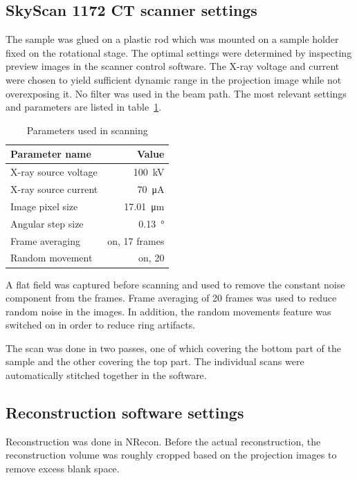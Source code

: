 \documentclass[a4paper,twoside,12pt]{article}
\begin{document}
\subsection{SkyScan 1172 CT scanner settings}
The sample was glued on a plastic rod which was mounted on a sample holder fixed on the rotational stage. The optimal settings were determined by inspecting preview images in the scanner control software. The X-ray voltage and current were chosen to yield sufficient dynamic range in the projection image while not overexposing it. No filter was used in the beam path. The most relevant settings and parameters are listed in table~\ref{table:settings}.

\begin{table}
    \centering
    \caption{Parameters used in scanning}
    \label{table:settings}
    \begin{tabular}{lr}
        \toprule
        Parameter name & Value \\
        \midrule
        X-ray source voltage & \SI{100}{\kilo\volt} \\
        X-ray source current & \SI{70}{\micro\ampere} \\
        Image pixel size & \SI{17.01}{\micro\meter} \\
        Angular step size & \SI{0.13}{\degree} \\
        Frame averaging & on, 17 frames \\
        Random movement & on, 20 \\
        \bottomrule
    \end{tabular}
\end{table}

A flat field was captured before scanning and used to remove the constant noise component from the frames. Frame averaging of 20 frames was used to reduce random noise in the images. In addition, the random movements feature was switched on in order to reduce ring artifacts.

The scan was done in two passes, one of which covering the bottom part of the sample and the other covering the top part. The individual scans were automatically stitched together in the software.

\subsection{Reconstruction software settings}
Reconstruction was done in NRecon. Before the actual reconstruction, the reconstruction volume was roughly cropped based on the projection images to remove excess blank space.
\end{document}
